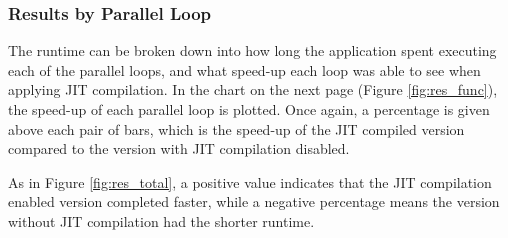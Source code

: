 \subsubsection{Results by Parallel Loop}
The runtime can be broken down into how long the application spent executing each of the parallel loops, and what speed-up each loop was able to see when applying JIT compilation. In the chart on the next page (Figure \ref{fig:res_func}), the speed-up of each parallel loop is plotted. Once again, a percentage is given above each pair of bars, which is the speed-up of the JIT compiled version compared to the version with JIT compilation disabled.
\par
As in Figure \ref{fig:res_total}, a positive value indicates that the JIT compilation enabled version completed faster, while a negative percentage means the version without JIT compilation had the shorter runtime.
\clearpage
